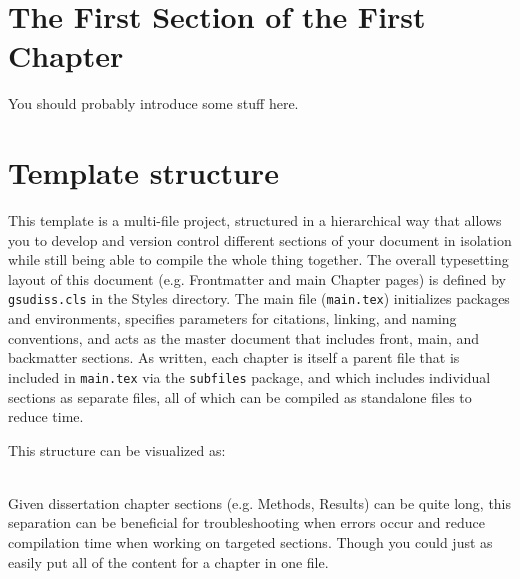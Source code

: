 \documentclass[../../main.tex]{subfiles}  %
\begin{document}
\section{The First Section of the First Chapter}
	
    You should probably introduce some stuff here.
    

\section{Template structure}

    This template is a multi-file project, structured in a hierarchical way that allows you to develop and version control different sections of your document in isolation while still being able to compile the whole thing together. 
    The overall typesetting layout of this document (e.g. Frontmatter and main Chapter pages) is defined by \verb|gsudiss.cls| in the Styles directory.
    The main file (\verb|main.tex|) initializes packages and environments, specifies parameters for citations, linking, and naming conventions, and acts as the master document that includes front, main, and backmatter sections. 
    As written, each chapter is itself a parent file that is included in \verb|main.tex| via the \verb|subfiles| package, and which includes individual sections as separate files, all of which can be compiled as standalone files to reduce time.

    This structure can be visualized as:
    \\

    \hspace*{2em} %
    \begin{minipage}{\dimexpr\textwidth-2em} %
    \end{minipage}
    \\

    Given dissertation chapter sections (e.g. Methods, Results) can be quite long, this separation can be beneficial for troubleshooting when errors occur and reduce compilation time when working on targeted sections. 
    Though you could just as easily put all of the content for a chapter in one file.
\end{document}
